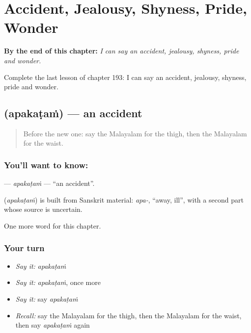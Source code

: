 
\chapter{Accident, Jealousy, Shyness, Pride, Wonder}
\label{ch:ml-accident-jealousy-shyness-pride-wonder}

\begin{chapteropening}
\textbf{By the end of this chapter:} \emph{I can say an accident, jealousy, shyness, pride and wonder.}

Complete the last lesson of chapter 193: I can say an accident, jealousy, shyness, pride and wonder.
\end{chapteropening}

\section[\texorpdfstring{\ml{അപകടം} (apakaṭaṁ)}{അപകടം (apakaṭaṁ)}]{ (apakaṭaṁ) — an accident}

\label{lesson:ML-C193-apakatam}



\begin{quote}
Before the new one: say the Malayalam for the thigh, then the Malayalam for the waist.
\end{quote}

\subsection*{You'll want to know: }
\textbf{} — \emph{apakaṭaṁ} — \textquotedblleft{}an accident\textquotedblright{}.

\begin{cousinweb}
\textbf{} (\emph{apakaṭaṁ}) is built from Sanskrit material: \emph{apa-}, \textquotedblleft{}away, ill\textquotedblright{}, with a second part whose source is uncertain.
\end{cousinweb}

\begin{grammarlens}[title={What you've built}]
One more word for this chapter.
\end{grammarlens}

\subsection*{Your turn}
\begin{itemize}
\raggedright
  \item \emph{Say it:} \emph{apakaṭaṁ}
  \item \emph{Say it:} \emph{apakaṭaṁ}, once more
  \item \emph{Say it:} say \emph{apakaṭaṁ}
  \item \emph{Recall:} say the Malayalam for the thigh, then the Malayalam for the waist, then say \emph{apakaṭaṁ} again
\end{itemize}


